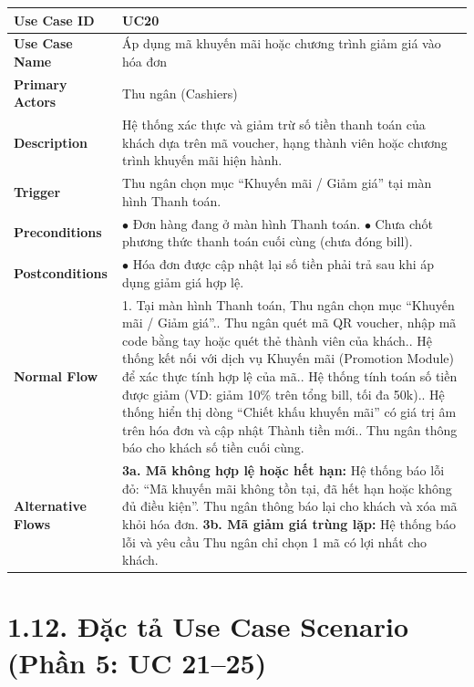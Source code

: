 \begin{longtable}{|L{3.5cm}|L{12.5cm}|}
\hline
\textbf{Use Case ID} & UC20 \\ \hline
\textbf{Use Case Name} & Áp dụng mã khuyến mãi hoặc chương trình giảm giá vào hóa đơn \\ \hline
\textbf{Primary Actors} & Thu ngân (Cashiers) \\ \hline
\textbf{Description} & Hệ thống xác thực và giảm trừ số tiền thanh toán của khách dựa trên mã voucher, hạng thành viên hoặc chương trình khuyến mãi hiện hành. \\ \hline
\textbf{Trigger} & Thu ngân chọn mục ``Khuyến mãi / Giảm giá'' tại màn hình Thanh toán. \\ \hline
\textbf{Preconditions} &
$\bullet$ Đơn hàng đang ở màn hình Thanh toán.\newline
$\bullet$ Chưa chốt phương thức thanh toán cuối cùng (chưa đóng bill). \\ \hline
\textbf{Postconditions} & $\bullet$ Hóa đơn được cập nhật lại số tiền phải trả sau khi áp dụng giảm giá hợp lệ. \\ \hline
\textbf{Normal Flow} &
1. Tại màn hình Thanh toán, Thu ngân chọn mục ``Khuyến mãi / Giảm giá''.. Thu ngân quét mã QR voucher, nhập mã code bằng tay hoặc quét thẻ thành viên của khách.. Hệ thống kết nối với dịch vụ Khuyến mãi (Promotion Module) để xác thực tính hợp lệ của mã.. Hệ thống tính toán số tiền được giảm (VD: giảm 10\% trên tổng bill, tối đa 50k).. Hệ thống hiển thị dòng ``Chiết khấu khuyến mãi'' có giá trị âm trên hóa đơn và cập nhật Thành tiền mới.. Thu ngân thông báo cho khách số tiền cuối cùng. \\ \hline
\textbf{Alternative Flows} &
\textbf{3a. Mã không hợp lệ hoặc hết hạn:} Hệ thống báo lỗi đỏ: ``Mã khuyến mãi không tồn tại, đã hết hạn hoặc không đủ điều kiện''. Thu ngân thông báo lại cho khách và xóa mã khỏi hóa đơn.\newline
\textbf{3b. Mã giảm giá trùng lặp:} Hệ thống báo lỗi và yêu cầu Thu ngân chỉ chọn 1 mã có lợi nhất cho khách. \\ \hline
\end{longtable}

\section*{1.12. Đặc tả Use Case Scenario (Phần 5: UC 21--25)}

